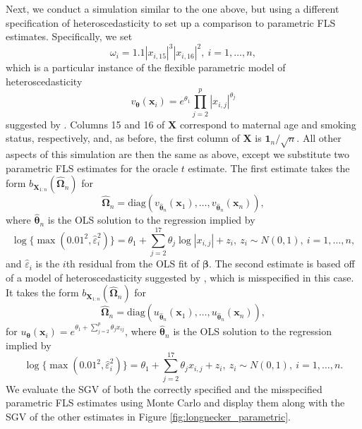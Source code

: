 \documentclass[12pt]{article}
\newcommand{\bl}[1]{{\mathbf #1}}
\newcommand{\bs}[1]{\boldsymbol #1}
\begin{document}
Next, we conduct a simulation similar to the one above, but using a different specification of heteroscedasticity to set up a comparison to parametric FLS estimates. Specifically, we set
\begin{equation*}
    \omega_i = 1.1|x_{i, 15}|^3 |x_{i, 16}|^2,~i=1, \dots, n,
\end{equation*}
which is a particular instance of the flexible parametric model of heteroscedasticity
\begin{equation*}
    v_{\bs{\theta}}(\bl{x}_i) = e^{\theta_1} \prod_{j=2}^p |x_{i, j}|^{\theta_j} 
\end{equation*}
suggested by \cite{romano_resurrecting_2017}. Columns 15 and 16 of $\bl{X}$ correspond to maternal age and smoking status, respectively, and, as before, the first column of $\bl{X}$ is $\bl{1}_n / \sqrt{n}$. All other aspects of this simulation are then the same as above, except we substitute two parametric FLS estimates for the oracle $t$ estimate. The first estimate takes the form $b_{\bl{X}_{1:n}}(\hat{\bs{\Omega}}_n)$ for
\begin{equation*}
    \hat{\bs{\Omega}}_n = \mathrm{diag}(v_{\hat{\bs{\theta}}_n}(\bl{x}_1), \dots, v_{\hat{\bs{\theta}}_n}(\bl{x}_n)),
\end{equation*}
where $\hat{\bs{\theta}}_n$ is the OLS solution to the regression implied by
\begin{equation*}
    \log\{\max(0.01^2, \hat{\varepsilon}_i^2)\} = \theta_1 + \sum_{j=2}^{17} \theta_j \log|x_{i,j}| + z_i,~ z_i \sim N(0,1),~i=1, \dots, n,
\end{equation*}
and $\hat{\varepsilon}_i$ is the $i$th residual from the OLS fit of $\bs{\beta}$. The second estimate is based off of a model of heteroscedasticity suggested by \cite{wooldridge2016introductory}, which is misspecified in this case. It takes the form $b_{\bl{X}_{1:n}}(\hat{\bs{\Omega}}_n)$ for
\begin{equation*}
    \hat{\bs{\Omega}}_n = \mathrm{diag}(u_{\hat{\bs{\theta}}_n}(\bl{x}_1), \dots, u_{\hat{\bs{\theta}}_n}(\bl{x}_n)),
\end{equation*}
for $u_{\bs{\theta}}(\bl{x}_i) = e^{\theta_1 + \sum_{j=2}^p \theta_j x_{ij}}$, where $\hat{\bs{\theta}}_n$ is the OLS solution to the regression implied by
\begin{equation*}
    \log\{\max(0.01^2, \hat{\varepsilon}_i^2)\} = \theta_1 + \sum_{j=2}^{17} \theta_j x_{i,j} + z_i,~ z_i \sim N(0,1),~i=1, \dots, n.
\end{equation*}
We evaluate the SGV of both the correctly specified and the misspecified parametric FLS estimates using Monte Carlo and display them along with the SGV of the other estimates in Figure \ref{fig:longnecker_parametric}.
\end{document}
